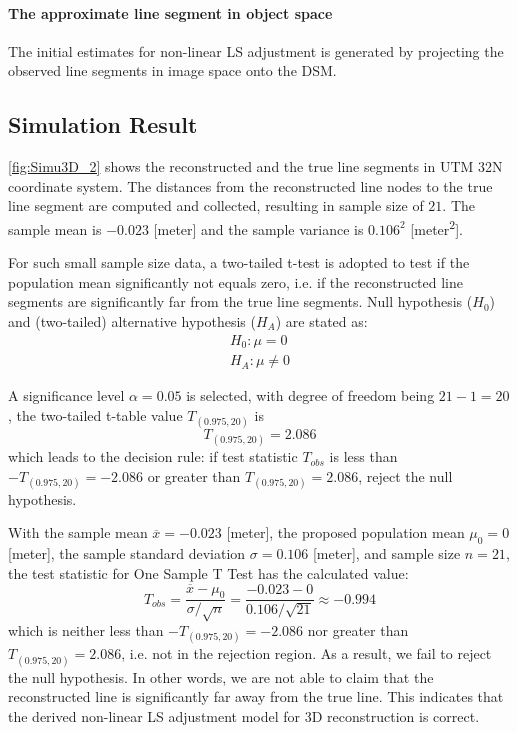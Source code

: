 \paragraph{The approximate line segment in object space}
The initial estimates for non-linear LS adjustment is generated by projecting the observed line segments in image space onto the DSM.

\clearpage

\subsection{Simulation Result}
\label{subsec:simuresult}

\cref{fig:Simu3D_2} shows the reconstructed and the true line segments in UTM 32N coordinate system. The distances from the reconstructed line nodes to the true line segment are computed and collected, resulting in sample size of $21$. The sample mean is $-0.023$ [meter] and the sample variance is $0.106^2$ [meter\textsuperscript{2}]. %

For such small sample size data, a two-tailed t-test is adopted to test if the population mean significantly not equals zero, i.e. {if the reconstructed line segments are significantly far from the true line segments}. Null hypothesis ($H_0$) and (two-tailed) alternative hypothesis ($H_A$) are stated as:
\begin{equation*}
\begin{split}
H_0: \mu=0\\
H_A: \mu\neq0
\end{split}
\end{equation*}

A significance level $\alpha=0.05$ is selected, with degree of freedom being $21-1=20$, the two-tailed t-table value $T_{(0.975,20)}$ is
\begin{equation*}
T_{(0.975,20)}=2.086
\end{equation*}
which leads to the decision rule: if test statistic $T_{obs}$ is less than $-T_{(0.975,20)}=-2.086$ or greater than $T_{(0.975,20)}=2.086$, reject the null hypothesis.

With the sample mean $\overline{x}=-0.023$ [meter],
the proposed population mean $\mu_0=0$ [meter],
the sample standard deviation $\sigma=0.106$ [meter],
and sample size $n=21$, the test statistic for One Sample T Test has the calculated value:
\begin{equation*}
T_{obs} = \frac{\overline{x}-\mu_0}{\sigma/\sqrt{n}}=\frac{-0.023-0}{0.106/\sqrt{21}}\approx-0.994
\end{equation*}
which is neither less than $-T_{(0.975,20)}=-2.086$ nor greater than $T_{(0.975,20)}=2.086$, i.e. not in the rejection region. As a result, we fail to reject the null hypothesis. In other words, {we are not able to claim that the reconstructed line is significantly far away from the true line}. This indicates that {the derived non-linear LS adjustment model for 3D reconstruction is correct}.


